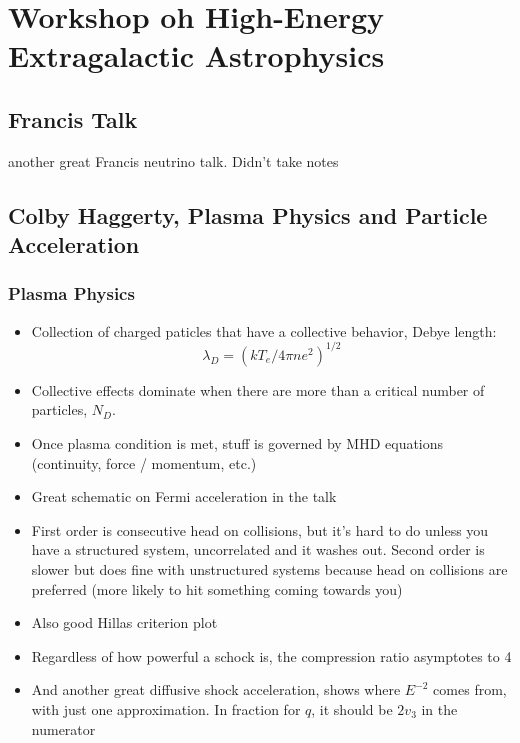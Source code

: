 \chapter{Workshop oh High-Energy Extragalactic Astrophysics}

\section{Francis Talk}
another great Francis neutrino talk. Didn't take notes

\section{Colby Haggerty, Plasma Physics and Particle Acceleration}
\subsection{Plasma Physics}
\begin{itemize}
    \item Collection of charged paticles that have a collective behavior, Debye length: $$\lambda_D = (kT_e / 4\pi n e^2)^{1/2}$$
    \item Collective effects dominate when there are more than a critical number of particles, $N_D$.
    \item Once plasma condition is met, stuff is governed by MHD equations (continuity, force / momentum, etc.)
    \item Great schematic on Fermi acceleration in the talk
    \item First order is consecutive head on collisions, but it's hard to do unless you have a structured system, uncorrelated and it washes out. Second order is slower but does fine with unstructured systems because head on collisions are preferred (more likely to hit something coming towards you)
    \item Also good Hillas criterion plot
    \item Regardless of how powerful a schock is, the compression ratio asymptotes to 4
    \item And another great diffusive shock acceleration, shows where $E^{-2}$ comes from, with just one approximation. In fraction for $q$, it should be $2v_3$ in the numerator 
\end{itemize}

